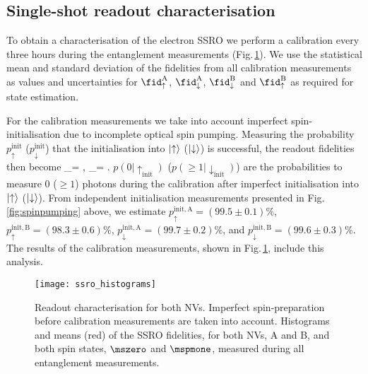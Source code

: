 \subsection{Single-shot readout characterisation}

To obtain a characterisation of the electron SSRO we perform a calibration\cite{Robledo:2011fs} every three hours during the entanglement measurements (Fig.\,\ref{fig:ssrohist}). We use the statistical mean and standard deviation of the fidelities from all calibration measurements as values and uncertainties for $\fid^\mathrm A_\uparrow$, $\fid^\mathrm A_\downarrow$, $\fid^\mathrm B_\downarrow$ and $\fid^\mathrm B_\uparrow$ as required for state estimation.

For the calibration measurements we take into account imperfect spin-initialisation due to incomplete optical spin pumping\cite{Robledo:2011fs}. Measuring the probability $p^\mathrm{init}_\uparrow$ ($p^\mathrm{init}_\downarrow$) that the initialisation into $\left|\uparrow\right>$ ($\left|\downarrow\right>$) is successful, the readout fidelities then become
\be
	\fid_\uparrow = ,
\ee
\be
	\fid_\downarrow = .
\ee
$p(0|\uparrow_\text{init})$ ($p(\geq 1|\downarrow_\text{init})$) are the probabilities to measure 0 ($\geq 1$) photons during the calibration after imperfect initialisation into $\left|\uparrow\right>$ ($\left|\downarrow\right>$). From independent initialisation measurements presented in Fig.\,\ref{fig:spinpumping} above, we estimate $p^\mathrm{init,A}_\uparrow = (99.5 \pm 0.1)\%$, $p^\mathrm{init,B}_\uparrow = (98.3 \pm 0.6)\%$, $p^\mathrm{init,A}_\downarrow = (99.7 \pm 0.2)\%$, and $p^\mathrm{init,B}_\downarrow = (99.6 \pm 0.3)\%$. The results of the calibration measurements, shown in Fig.\,\ref{fig:ssrohist}, include this analysis.

\begin{figure}[h]
    \centering
    \texttt{[image: ssro\_histograms]}
    \caption{Readout characterisation for both NVs. Imperfect spin-preparation before calibration measurements are taken into account. Histograms and means (red) of the SSRO fidelities, for both NVs, A and B, and both spin states, $\mszero$ and $\mspmone$, measured during all entanglement measurements.}
	\label{fig:ssrohist}
\end{figure}

